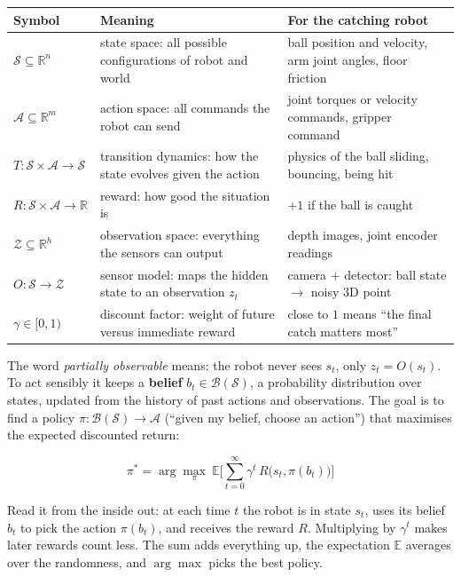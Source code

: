 \documentclass[11pt,a4paper]{article}
\begin{document}
\begin{center}
\renewcommand{\arraystretch}{1.25}
\begin{tabularx}{\textwidth}{@{}l X X@{}}
\toprule
Symbol & Meaning & For the catching robot \\
\midrule
$\mathcal S\subseteq\mathbb R^n$ & state space: all possible configurations of robot and world &
ball position and velocity, arm joint angles, floor friction \\
$\mathcal A\subseteq\mathbb R^m$ & action space: all commands the robot can send &
joint torques or velocity commands, gripper command \\
$T:\mathcal S\times\mathcal A\to\mathcal S$ & transition dynamics: how the state evolves given
the action & physics of the ball sliding, bouncing, being hit \\
$R:\mathcal S\times\mathcal A\to\mathbb R$ & reward: how good the situation is &
$+1$ if the ball is caught \\
$\mathcal Z\subseteq\mathbb R^h$ & observation space: everything the sensors can output &
depth images, joint encoder readings \\
$O:\mathcal S\to\mathcal Z$ & sensor model: maps the hidden state to an observation $z_t$ &
camera + detector: ball state $\to$ noisy 3D point \\
$\gamma\in[0,1)$ & discount factor: weight of future versus immediate reward &
close to $1$ means ``the final catch matters most'' \\
\bottomrule
\end{tabularx}
\end{center}

The word \emph{partially observable} means: the robot never sees $s_t$, only $z_t=O(s_t)$. To act
sensibly it keeps a \textbf{belief} $b_t\in\mathcal B(\mathcal S)$, a probability distribution
over states, updated from the history of past actions and observations. The goal is to find a
policy $\pi:\mathcal B(\mathcal S)\to\mathcal A$ (``given my belief, choose an action'') that
maximises the expected discounted return:
\begin{eqbox}
\[
\pi^{*}=\arg\max_{\pi}\ \mathbb E\Big[\sum_{t=0}^{\infty}\gamma^{t}\,R\big(s_t,\pi(b_t)\big)\Big]
\]
\end{eqbox}
Read it from the inside out: at each time $t$ the robot is in state $s_t$, uses its belief $b_t$
to pick the action $\pi(b_t)$, and receives the reward $R$. Multiplying by $\gamma^t$ makes later
rewards count less. The sum adds everything up, the expectation $\mathbb E$ averages over the
randomness, and $\arg\max$ picks the best policy.
\end{document}
